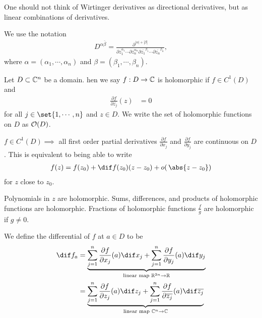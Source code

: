 \begin{note}
    One should not think of Wirtinger derivatives as directional derivatives, but as linear combinations of derivatives.
\end{note}

\begin{note}
    We use the notation
    \begin{align*}
        D^{\alpha \overline{\beta}} = \frac{\partial^{|\alpha|+ |\beta|}}{\partial z_1^{\alpha_1} \cdots \partial z_n^{\alpha_n} \partial \overline{z_1}^{\beta_1} \cdots \partial \overline{z_n}^{\beta_n} },
    \end{align*}
    where $\alpha = (\alpha_1, \cdots, \alpha_n)$ and $\beta = (\beta_1 , \cdots, \beta_n)$.
\end{note}


\begin{definition}
    Let $D \subset \mathbb{C}^n$ be a domain. hen we say $f : D \to \mathbb{C}$ is holomorphic if $f \in C^1(D)$ and
    \begin{align*}
        \frac{\partial f }{\partial \overline{z_j}}(z) &= 0
    \end{align*}
    for all $j \in \set{ 1 , \cdots, n }$ and $ z \in D$. We write the set of holomorphic functions on $D$ as $\mathcal{O}(D)$.
\end{definition}

\begin{note}
    $f \in C^1(D) \implies$ all first order partial derivatives $\frac{\partial f}{\partial x_j}$ and $\frac{\partial f}{\partial y_j}$ are continuous on $D$. This is equivalent to being able to write
    \begin{align*}
        f(z) = f(z_0) + \dif f(z_0) (z-z_0) + o( \, \abs{z-z_0})
    \end{align*}
    for $z$ close to $z_0$.
\end{note}

\begin{example}
    Polynomials in $z$ are holomorphic. Sums, differences, and products of holomorphic functions are holomorphic. Fractions of holomorphic functions $\frac{f}{g}$ are holomorphic if $g \neq 0$.
\end{example}

\begin{definition}
    We define the differential of $f$ at $a \in D$ to be
    \begin{align*}
        \dif f_a &= \underbrace{\sum_{j=1}^n \frac{\partial f }{\partial x_j } (a) \dif x_j + \sum_{j=1}^n \frac{\partial f }{\partial y_j} (a) \dif y_j}_{\text{linear map } \R^{2n} \to \R}\\
        &= \underbrace{\sum_{j=1}^n \frac{\partial f }{\partial z_j } (a) \dif z_j + \sum_{j=1}^n \frac{\partial f }{\partial \overline{z_j}} (a) \dif \overline{z_j}}_{\text{linear map } \C^{n} \to \C}
     \end{align*}
\end{definition}

